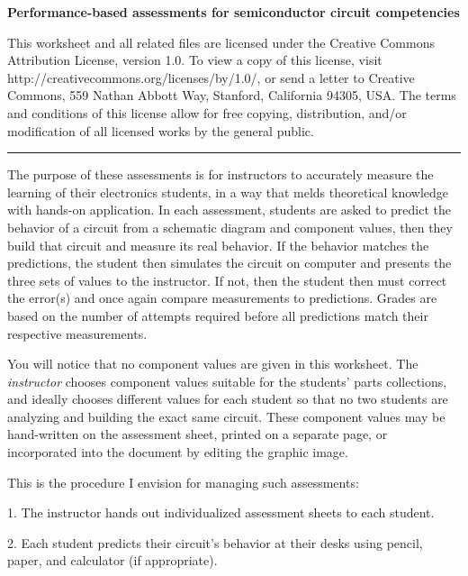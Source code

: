 
\centerline{\bf Performance-based assessments for semiconductor circuit competencies} \bigskip 
 
This worksheet and all related files are licensed under the Creative Commons Attribution License, version 1.0.  To view a copy of this license, visit http://creativecommons.org/licenses/by/1.0/, or send a letter to Creative Commons, 559 Nathan Abbott Way, Stanford, California 94305, USA.  The terms and conditions of this license allow for free copying, distribution, and/or modification of all licensed works by the general public.

\bigskip 

\hrule

\vskip 10pt

The purpose of these assessments is for instructors to accurately measure the learning of their electronics students, in a way that melds theoretical knowledge with hands-on application.  In each assessment, students are asked to predict the behavior of a circuit from a schematic diagram and component values, then they build that circuit and measure its real behavior.  If the behavior matches the predictions, the student then simulates the circuit on computer and presents the three sets of values to the instructor.  If not, then the student then must correct the error(s) and once again compare measurements to predictions.  Grades are based on the number of attempts required before all predictions match their respective measurements.

You will notice that no component values are given in this worksheet.  The {\it instructor} chooses component values suitable for the students' parts collections, and ideally chooses different values for each student so that no two students are analyzing and building the exact same circuit.  These component values may be hand-written on the assessment sheet, printed on a separate page, or incorporated into the document by editing the graphic image.

\vskip 10pt

\noindent
This is the procedure I envision for managing such assessments:

\vskip 10pt

\item{1.} The instructor hands out individualized assessment sheets to each student.

\item{2.} Each student predicts their circuit's behavior at their desks using pencil, paper, and calculator (if appropriate).


